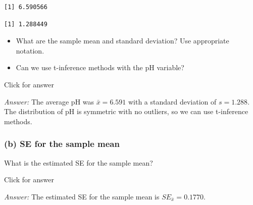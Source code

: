 \documentclass[
]{book}
\newenvironment{Shaded}{\begin{snugshade}}{\end{snugshade}}
\newcommand{\DecValTok}[1]{\textcolor[rgb]{0.00,0.00,0.81}{#1}}
\newcommand{\FunctionTok}[1]{\textcolor[rgb]{0.00,0.00,0.00}{#1}}
\newcommand{\NormalTok}[1]{#1}
\newcommand{\SpecialCharTok}[1]{\textcolor[rgb]{0.00,0.00,0.00}{#1}}
\providecommand{\tightlist}{%
  \setlength{\itemsep}{0pt}\setlength{\parskip}{0pt}}
\begin{document}
\begin{Shaded}
\end{Shaded}

\begin{verbatim}
[1] 6.590566
\end{verbatim}

\begin{Shaded}
\end{Shaded}

\begin{verbatim}
[1] 1.288449
\end{verbatim}

\begin{itemize}
\tightlist
\item
  What are the sample mean and standard deviation? Use appropriate notation.
\item
  Can we use t-inference methods with the pH variable?
\end{itemize}

Click for answer

\emph{Answer:} The average pH was \(\bar{x} = 6.591\) with a standard deviation of \(s=1.288\). The distribution of pH is symmetric with no outliers, so we can use t-inference methods.

\hypertarget{b-se-for-the-sample-mean}{%
\subsubsection{(b) SE for the sample mean}\label{b-se-for-the-sample-mean}}

What is the estimated SE for the sample mean?

Click for answer

\emph{Answer:} The estimated SE for the sample mean is \(SE_{\bar{x}} = 0.1770\).

\begin{Shaded}
\end{Shaded}
\end{document}
